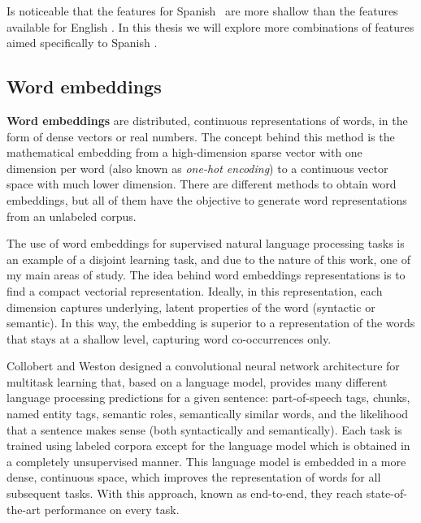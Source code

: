 Is noticeable that the features for Spanish \wsd~are more shallow than the
features available for English \wsd. In this thesis we will explore more
combinations of features aimed specifically to Spanish \vsd.

\subsection{Word embeddings}\label{sec:domain_background:embeddings}

{\bf Word embeddings} are distributed, continuous representations of words, in
the form of dense vectors or real numbers. The concept behind this method is
the mathematical embedding from a high-dimension sparse vector with one
dimension per word (also known as {\em one-hot encoding}) to a continuous
vector space with much lower dimension. There are different methods to
obtain word embeddings, but all of them have the objective to generate word
representations from an unlabeled corpus. 

The use of word embeddings for supervised natural language processing tasks is
an example of a disjoint learning task, and due to the nature of this work, one
of my main areas of study. The idea behind word embeddings representations is
to find a compact vectorial representation. Ideally, in this representation,
each dimension captures underlying, latent properties of the word (syntactic or
semantic). In this way, the embedding is superior to a representation of the
words that stays at a shallow level, capturing word co-occurrences only.

Collobert and Weston \cite{Collobert:2008:UAN:1390156.1390177} designed a
convolutional neural network architecture for multitask learning that, based on
a language model, provides many different language processing predictions for a
given sentence: part-of-speech tags, chunks, named entity tags, semantic roles,
semantically similar words, and the likelihood that a sentence makes sense
(both syntactically and semantically). Each task is trained using labeled
corpora except for the language model which is obtained in a completely
unsupervised manner. This language model is embedded in a more dense,
continuous space, which improves the representation of words for all subsequent
tasks.  With this approach, known as end-to-end, they reach state-of-the-art
performance on every task.

